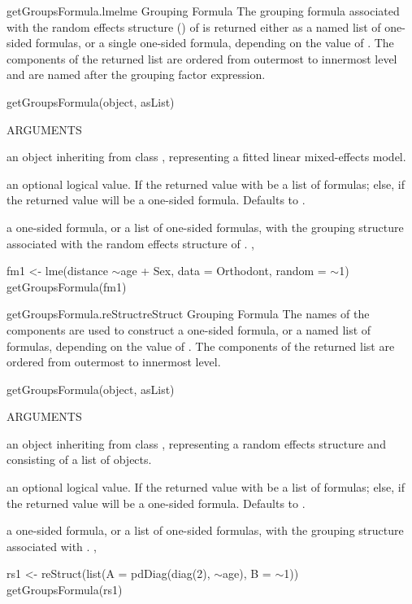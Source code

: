 \documentclass[pdftex]{article} \usepackage{url,graphicx}
\renewcommand{\Twiddle}{\mbox{\(\sim\)}}
\begin{document}
\begin{Helpfile}{getGroupsFormula.lme}{lme Grouping Formula}
The grouping formula associated with the random effects structure
() of  is returned either as
a named list of one-sided formulas, or a single one-sided formula,
depending  on the value of . The components of the
returned list are ordered from outermost to innermost level and are
named after the grouping factor expression.
\begin{Example}
getGroupsFormula(object, asList)
\end{Example}
\begin{Argument}{ARGUMENTS}
\item[\Co{object:}]
an object inheriting from class , representing
a fitted linear mixed-effects model.
\item[\Co{asList:}]
an optional logical value. If  the returned
value with be a list of formulas; else, if  the returned
value will be a one-sided formula. Defaults to .
\end{Argument}
a one-sided formula, or a list of one-sided formulas, with the
grouping structure associated with the random effects structure of
.
, 
\need 15pt
\vspace{-16pt} 
\begin{Example}
fm1 <- lme(distance \Twiddle age + Sex, data = Orthodont, random = \Twiddle  1)
getGroupsFormula(fm1)
\end{Example}
\end{Helpfile}
\begin{Helpfile}{getGroupsFormula.reStruct}{reStruct Grouping Formula}
The names of the  components are used to construct a
one-sided formula, or a named list of formulas, depending on the value
of .  The components of the returned list are ordered
from outermost to innermost level.
\begin{Example}
getGroupsFormula(object, asList)
\end{Example}
\begin{Argument}{ARGUMENTS}
\item[\Co{object:}]
an object inheriting from class ,
representing a random effects structure and consisting of a list of
 objects.
\item[\Co{asList:}]
an optional logical value. If  the returned
value with be a list of formulas; else, if  the returned
value will be a one-sided formula. Defaults to .
\end{Argument}
a one-sided formula, or a list of one-sided formulas, with the
grouping structure associated with .
, 
\need 15pt
\vspace{-16pt} 
\begin{Example}
rs1 <- reStruct(list(A = pdDiag(diag(2), \Twiddle age), B = \Twiddle 1))
getGroupsFormula(rs1)
\end{Example}
\end{Helpfile}
\end{document}
